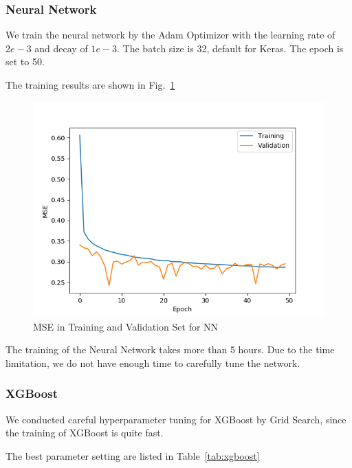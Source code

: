 \subsubsection{Neural Network}
We train the neural network by the Adam Optimizer with the learning rate of $2e-3$ and decay of $1e-3$. The batch size is 32, default for Keras. The epoch is set to 50.

The training results are shown in Fig.~\ref{fig:nn2}

\begin{figure}[!htbp]
	\centering
	\includegraphics[width=\linewidth]{nn2.png}
	\caption{MSE in Training and Validation Set for NN}
	\label{fig:nn2}
\end{figure}

The training of the Neural Network takes more than 5 hours. Due to the time limitation, we do not have enough time to carefully tune the network.

\subsubsection{XGBoost}
We conducted careful hyperparameter tuning for XGBoost by Grid Search, since the training of XGBoost is quite fast.

The best parameter setting are listed in Table~\ref{tab:xgboost}

